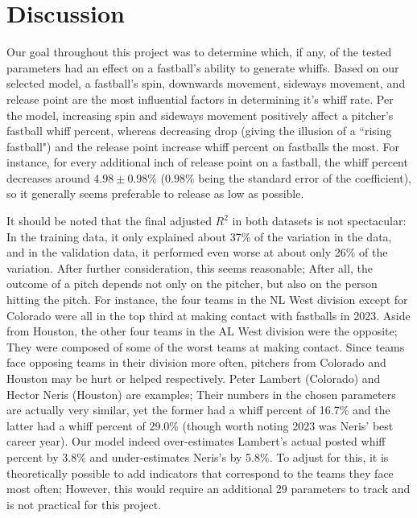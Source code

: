 \documentclass[12pt]{article}
\begin{document}
\section{Discussion}
Our goal throughout this project was to determine which, if any, of the tested parameters had an effect on a fastball's ability to generate whiffs. Based on our selected model, a fastball's spin, downwards movement, sideways movement, and release point are the most influential factors in determining it's whiff rate. Per the model, increasing spin and sideways movement positively affect a pitcher's fastball whiff percent, whereas decreasing drop (giving the illusion of a ``rising fastball") and the release point increase whiff percent on fastballs the most. For instance, for every additional inch of release point on a fastball, the whiff percent decreases around $ 4.98 \pm 0.98$\% ($0.98\%$ being the standard error of the coefficient), so it generally seems preferable to release as low as possible.

\medskip

It should be noted that the final adjusted $R^2$ in both datasets is not spectacular: In the training data, it only explained about 37\% of the variation in the data, and in the validation data, it performed even worse at about only 26\% of the variation. After further consideration, this seems reasonable; After all, the outcome of a pitch depends not only on the pitcher, but also on the person hitting the pitch. For instance, the four teams in the NL West division except for Colorado were all in the top third at making contact with fastballs in 2023. Aside from Houston, the other four teams in the AL West division were the opposite; They were composed of some of the worst teams at making contact. Since teams face opposing teams in their division more often, pitchers from Colorado and Houston may be hurt or helped respectively. Peter Lambert (Colorado) and Hector Neris (Houston) are examples; Their numbers in the chosen parameters are actually very similar, yet the former had a whiff percent of 16.7\% and the latter had a whiff percent of 29.0\% (though worth noting 2023 was Neris' best career year). Our model indeed over-estimates Lambert's actual posted whiff percent by 3.8\% and under-estimates Neris's by 5.8\%. To adjust for this, it is theoretically possible to add indicators that correspond to the teams they face most often; However, this would require an additional 29 parameters to track and is not practical for this project. 

\medskip
\end{document}

